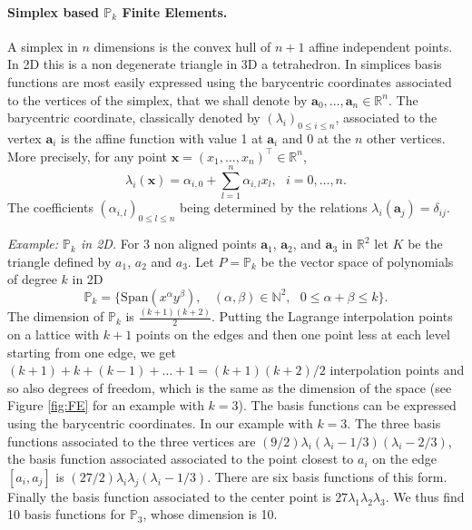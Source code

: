 \paragraph{Simplex based $ \mathbb{P}_k$ Finite Elements.}
A simplex in $n$ dimensions is the convex hull of $n+1$ affine independent points. In 2D this is a non degenerate triangle in 3D a tetrahedron. In simplices basis functions are most easily expressed using the barycentric coordinates associated to the vertices of the simplex, that we shall denote by $ \mathbf{a}_0, \dots, \mathbf{a}_n \in \mathbb{R}^n$. The barycentric coordinate, classically denoted by $(\lambda_i)_{0\leq i\leq n}$, associated to the vertex $ \mathbf{a}_i$ is the affine function with value 1 at $ \mathbf{a}_i$ and 0 at the $n$ other vertices. More precisely, for any point $ \mathbf{x}=(x_1,\dots,x_n)^\top \in \mathbb{R}^{n}$,
\begin{equation}\label{eq:barcoord}
\lambda_i( \mathbf{x}) = \alpha_{i,0} + \sum_{l=1}^n \alpha_{i,l} x_l, ~~~ i=0,\dots,n.
\end{equation}
The coefficients $(\alpha_{i,l})_{0\leq l \leq n}$ being determined by the relations  $\lambda_i( \mathbf{a}_j)  =\delta_{ij}$.

\textit{Example: $\mathbb{P}_k$ in 2D.} For 3 non aligned points $ \mathbf{a}_1$, $ \mathbf{a}_2$,  and $ \mathbf{a}_3$ in $\mathbb{R}^2$ let $K$ be the triangle defined by $a_1$, $a_2$ and $a_3$. Let $P=\mathbb{P}_k$ be the vector space of polynomials of degree $k$ in 2D
$$ \mathbb{P}_k=\{\mathrm{Span}(x^\alpha y^\beta), ~~~~ (\alpha,\beta)\in \mathbb{N}^2, ~~~ 0\leq \alpha+\beta \leq k   \}.$$
The dimension of $ \mathbb{P}_k$ is $\frac{(k+1)(k+2)}{2}$. Putting the Lagrange interpolation points on a lattice with $k+1$ points on the edges and then one point less at each level starting from one edge, we get
$(k+1) + k + (k-1) + \dots +1 = (k+1)(k+2)/2$ interpolation points and so also degrees of freedom, which is the same as the dimension of the space (see Figure \ref{fig:FE} for an example with $k=3$). 
The basis functions can be expressed using the barycentric coordinates. In our example with $k=3$.
The three basis functions associated to the three vertices are
$(9/2)\lambda_i( \lambda_i -1/3)(\lambda_i-2/3)$,
the basis function associated  associated to the point closest to $a_i$ on the edge $[a_i,a_j]$ is
$(27/2)\lambda_i\lambda_j(\lambda_i-1/3)$. There are six basis functions of this form.
Finally the basis function associated to the center point is $27\lambda_1\lambda_2\lambda_3$.
We thus find 10 basis functions for $ \mathbb{P}_3$, whose dimension is 10.

